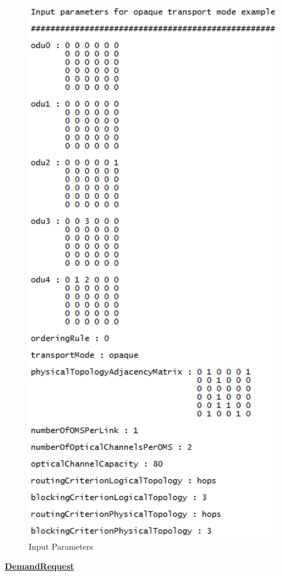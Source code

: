 \begin{figure}[H]
	\centering
	\includegraphics[width=11cm]{sdf/heuristic/opaque/figures/InputParameters}
	\caption{Input Parameters}
	\label{input_parameters}
\end{figure}

\underline{\textbf{DemandRequest}}
 

